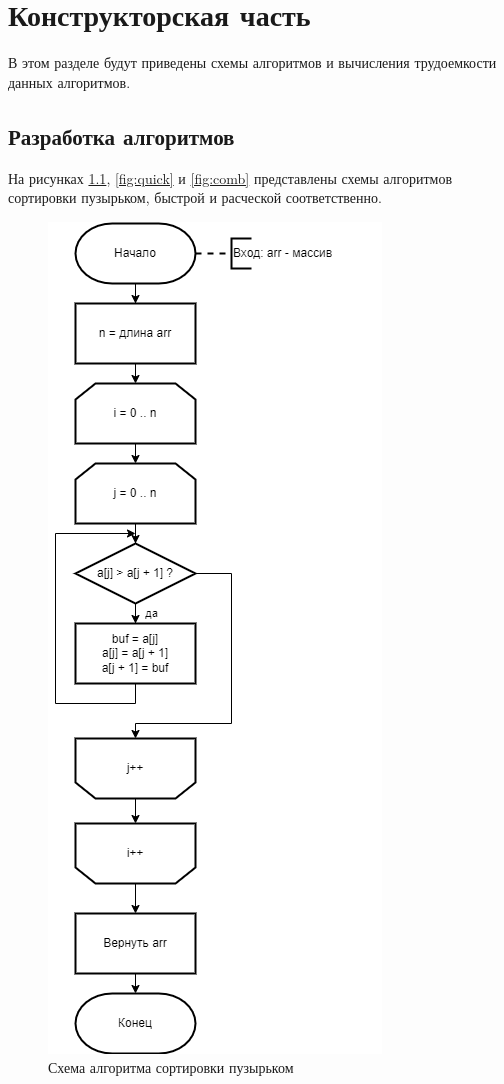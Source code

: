\chapter{Конструкторская часть}
В этом разделе будут приведены схемы алгоритмов и вычисления трудоемкости данных алгоритмов.
\section{Разработка алгоритмов}




На рисунках  \ref{fig:bubble}, \ref{fig:quick} и \ref{fig:comb} представлены схемы алгоритмов сортировки пузырьком, быстрой и расческой соответственно.

\begin{figure}[H]
	\centering
	\includegraphics[width=0.7\linewidth, height=0.9\textheight]{inc/img/bubble}
	\caption{Схема алгоритма сортировки пузырьком}
	\label{fig:bubble}
\end{figure}

